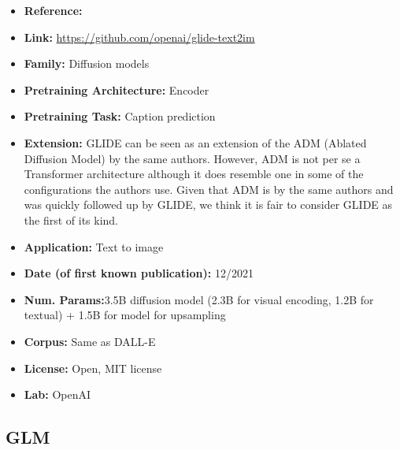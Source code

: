 \documentclass{article}
\begin{document}
            \begin{itemize}
                \item \textbf{Reference:} \href{https://arxiv.org/abs/2112.10741}{}
                \item \textbf{Link:} \url{https://github.com/openai/glide-text2im}
                \item \textbf{Family:} Diffusion models 
                \item \textbf{Pretraining Architecture:} Encoder
                \item \textbf{Pretraining Task:}  Caption prediction
                \item \textbf{Extension:} GLIDE can be seen as an extension of the ADM (Ablated Diffusion Model) by the same authors. However, ADM is not per se a Transformer architecture although it does resemble one in some of the configurations the authors use. Given that ADM is by the same authors and was quickly followed up by GLIDE, we think it is fair to consider GLIDE as the first of its kind.  
                \item \textbf{Application:} Text to image
                \item \textbf{Date (of first known publication):} 12/2021
                \item \textbf{Num. Params:}3.5B diffusion model (2.3B for visual encoding, 1.2B for textual) + 1.5B for model for upsampling
                \item \textbf{Corpus:} Same as DALL-E
                \item \textbf{License:} Open, MIT license
                \item \textbf{Lab:} OpenAI
            \end{itemize}

\subsection{GLM}
\end{document}
